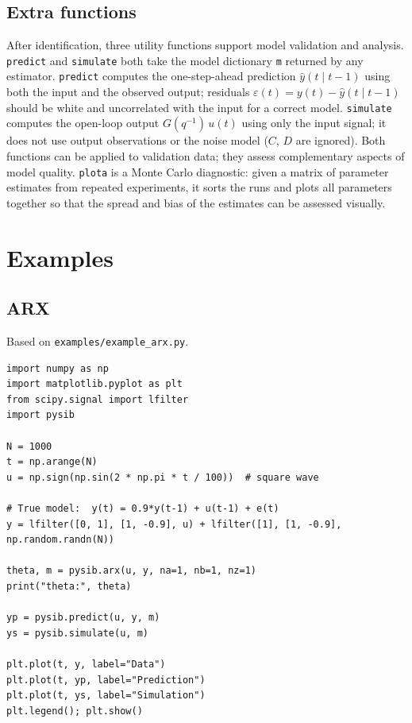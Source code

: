 \documentclass[11pt,a4paper]{article}
\begin{document}
\newpage
\subsection{Extra functions}

After identification, three utility functions support model validation
and analysis.
\texttt{predict} and \texttt{simulate} both take the model dictionary
\texttt{m} returned by any estimator.
\texttt{predict} computes the one-step-ahead prediction
$\hat{y}(t\mid t-1)$ using both the input and the observed output;
residuals $\varepsilon(t) = y(t) - \hat{y}(t\mid t-1)$ should be
white and uncorrelated with the input for a correct model.
\texttt{simulate} computes the open-loop output $G(q^{-1})\,u(t)$
using only the input signal; it does not use output observations or
the noise model ($C$, $D$ are ignored).
Both functions can be applied to validation data; they assess
complementary aspects of model quality.
\texttt{plota} is a Monte Carlo diagnostic: given a matrix of
parameter estimates from repeated experiments, it sorts the runs and
plots all parameters together so that the spread and bias of the
estimates can be assessed visually.





\newpage
\section{Examples}

\subsection{ARX}

Based on \texttt{examples/example\_arx.py}.

\begin{lstlisting}
import numpy as np
import matplotlib.pyplot as plt
from scipy.signal import lfilter
import pysib

N = 1000
t = np.arange(N)
u = np.sign(np.sin(2 * np.pi * t / 100))  # square wave

# True model:  y(t) = 0.9*y(t-1) + u(t-1) + e(t)
y = lfilter([0, 1], [1, -0.9], u) + lfilter([1], [1, -0.9], np.random.randn(N))

theta, m = pysib.arx(u, y, na=1, nb=1, nz=1)
print("theta:", theta)

yp = pysib.predict(u, y, m)
ys = pysib.simulate(u, m)

plt.plot(t, y, label="Data")
plt.plot(t, yp, label="Prediction")
plt.plot(t, ys, label="Simulation")
plt.legend(); plt.show()
\end{lstlisting}
\end{document}
